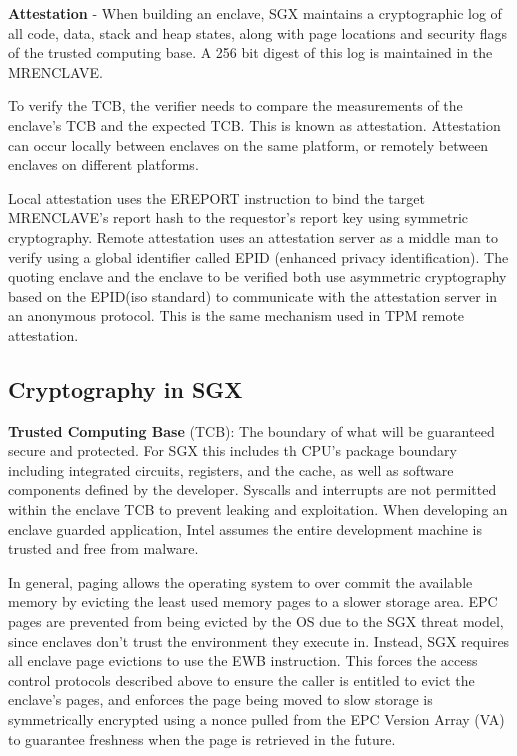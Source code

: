 \textbf{Attestation} - When building an enclave, SGX maintains a cryptographic log of all code, data, stack and heap states, along with page locations and security flags of the trusted computing base. A 256 bit digest of this log is maintained in the MRENCLAVE. 

To verify the TCB, the verifier needs to compare the measurements of the enclave's TCB and the expected TCB. This is known as attestation. Attestation can occur locally between enclaves on the same platform, or remotely between enclaves on different platforms. 

Local attestation uses the EREPORT instruction to bind the target MRENCLAVE's report hash to the requestor's report key using symmetric cryptography. Remote attestation uses an attestation server as a middle man to verify using a global identifier called EPID (enhanced privacy identification). The quoting enclave and the enclave to be verified both use asymmetric cryptography based on the EPID(iso standard) to communicate with the attestation server in an anonymous protocol. This is the same mechanism used in TPM remote attestation. 



\subsection{Cryptography in SGX}

\textbf{Trusted Computing Base} (TCB): The boundary of what will be guaranteed secure and protected. For SGX this includes th CPU's package boundary including integrated circuits, registers, and the cache, as well as software components defined by the developer. Syscalls and interrupts are not permitted within the enclave TCB to prevent leaking and exploitation. When developing an enclave guarded application, Intel assumes the entire development machine is trusted and free from malware. 

In general, paging allows the operating system to over commit the available memory by evicting the least used memory pages to a slower storage area. EPC pages are prevented from being evicted by the OS due to the SGX threat model, since enclaves don't trust the environment they execute in. Instead, SGX requires all enclave page evictions to use the EWB instruction. This forces the access control protocols described above to ensure the caller is entitled to evict the enclave's pages, and enforces the page being moved to slow storage is symmetrically encrypted using a nonce pulled from the EPC Version Array (VA) to guarantee freshness when the page is retrieved in the future.  

